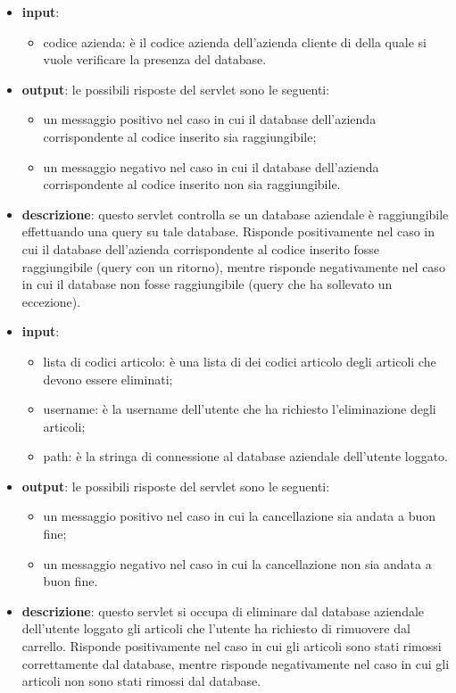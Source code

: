 \begin{itemize}
	\item \textbf{input}:
		\begin{itemize}
			\item codice azienda: è il codice azienda dell'azienda cliente di \visione{} della quale si vuole verificare la presenza del database.
		\end{itemize}
	\item \textbf{output}: le possibili risposte del servlet sono le seguenti:
		\begin{itemize}
			\item un messaggio positivo nel caso in cui il database dell'azienda corrispondente al codice inserito sia raggiungibile;
			\item un messaggio negativo nel caso in cui il database dell'azienda corrispondente al codice inserito non sia raggiungibile.
		\end{itemize}
	\item \textbf{descrizione}: questo servlet controlla se un database aziendale è raggiungibile effettuando una query su tale database. Risponde positivamente nel caso in cui il database dell'azienda corrispondente al codice inserito fosse raggiungibile (query con un ritorno), mentre risponde negativamente nel caso in cui il database non fosse raggiungibile (query che ha sollevato un eccezione).
\end{itemize}


\begin{itemize}
	\item \textbf{input}:
		\begin{itemize}
			\item lista di codici articolo: è una lista di dei codici articolo degli articoli che devono essere eliminati;
			\item username: è la username dell'utente che ha richiesto l'eliminazione degli articoli;
			\item path: è la stringa di connessione al database aziendale dell'utente loggato.
		\end{itemize}
	\item \textbf{output}: le possibili risposte del servlet sono le seguenti:
		\begin{itemize}
			\item un messaggio positivo nel caso in cui la cancellazione sia andata a buon fine;
			\item un messaggio negativo nel caso in cui la cancellazione non sia andata a buon fine.
		\end{itemize}
	\item \textbf{descrizione}: questo servlet si occupa di eliminare dal database aziendale dell'utente loggato gli articoli che l'utente ha richiesto di rimuovere dal carrello. Risponde positivamente nel caso in cui gli articoli sono stati rimossi correttamente dal database, mentre risponde negativamente nel caso in cui gli articoli non sono stati rimossi dal database.
\end{itemize}

